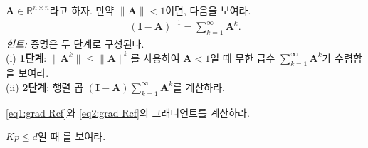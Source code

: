 \documentclass[../../book-main_ko.tex]{subfiles}
\begin{document}
\begin{exercise}
\end{exercise}


\begin{exercise}\label{ex:neumannn} 
$\bm A \in \mathbb{R}^{n\times n}$라고 하자. 만약 $\|\bm A\| < 1$이면, 다음을 보여라.
\begin{align}\label{eq:neumann}
    \left( \bm I - \bm A\right)^{-1} = \sum_{k=1}^\infty \bm A^k.  
\end{align}
{\em 힌트:} 증명은 두 단계로 구성된다. \\
(i) {\bf 1단계}: $\|\bm A^k\| \le \|\bm A\|^k$를 사용하여 $\bm A < 1$일 때 무한 급수 $\sum_{k=1}^\infty \bm A^k$가 수렴함을 보여라. \\
(ii) {\bf 2단계}: 행렬 곱 $(\bm I - \bm A) \sum_{k=1}^\infty \bm A^k$를 계산하라.
\end{exercise}


\begin{exercise}
    \eqref{eq1:grad Rcf}와 \eqref{eq2:grad Rcf}의 그래디언트를 계산하라.
\end{exercise}


\begin{exercise}
    $Kp \le d$일 때 를 보여라.
\end{exercise}
\end{document}

